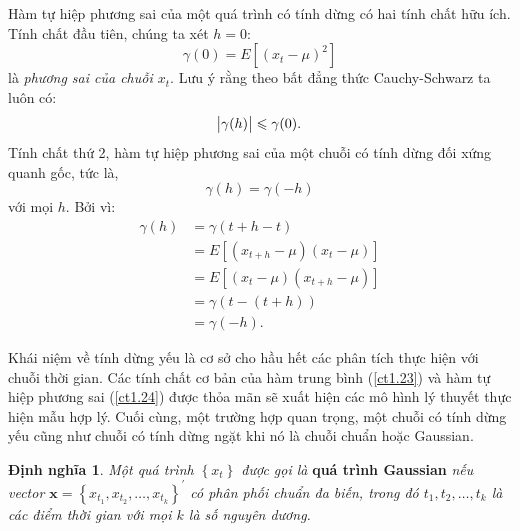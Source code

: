 \documentclass[12pt, a4paper,oneside]{book}
\theoremstyle{definition}
\newtheorem{dn}[theo]{Định nghĩa}
\begin{document}
Hàm tự hiệp phương sai của một quá trình có tính dừng có hai tính chất hữu ích. Tính chất đầu tiên, chúng ta xét $h = 0$:
\begin{equation}
\gamma(0)=E[(x_{t}-\mu)^{2}] \label{ct1.26}
\end{equation}
là \textit{phương sai của chuỗi $x_{t}$}. Lưu ý rằng theo bất đẳng thức Cauchy-Schwarz ta luôn có:
\begin{equation}
\abs{\gamma(h)}\leqslant \gamma(0). \label{ct1.27}
\end{equation}
Tính chất thứ 2, hàm tự hiệp phương sai của một chuỗi có tính dừng đối xứng quanh gốc, tức là,
\begin{equation}
\gamma(h)=\gamma(-h) \label{ct1.28}
\end{equation}
với mọi $h$. Bởi vì:
\begin{align*}
\gamma(h)&=\gamma(t+h-t) \\
&=E[(x_{t+h}-\mu)(x_{t}-\mu)]\\
&=E[(x_{t}-\mu)(x_{t+h}-\mu)]\\
&=\gamma(t-(t+h))\\
&=\gamma(-h). 
\end{align*}

Khái niệm về tính dừng yếu là cơ sở cho hầu hết các phân tích thực hiện với chuỗi thời gian. Các tính chất cơ bản của hàm trung bình (\ref{ct1.23}) và hàm tự hiệp phương sai (\ref{ct1.24}) được thỏa mãn sẽ xuất hiện các mô hình lý thuyết thực hiện mẫu hợp lý. Cuối cùng, một trường hợp quan trọng, một chuỗi có tính dừng yếu cũng như chuỗi có tính dừng ngặt khi nó là chuỗi chuẩn hoặc Gaussian.
\begin{dn}\cite{8} \textit{Một quá trình $ \left\lbrace x_{t}\right\rbrace  $ được gọi là} \textbf{quá trình Gaussian} \textit{nếu vector $ \textbf{x}=\left\lbrace x_{t_{1}}, x_{t_{2}}, \dots, x_{t_{k}}\right\rbrace^{'} $ có phân phối chuẩn đa biến, trong đó $t_{1}, t_{2}, \dots, t_{k}$ là các điểm thời gian với mọi $k$ là số nguyên dương.}
\end{dn}
\end{document}
